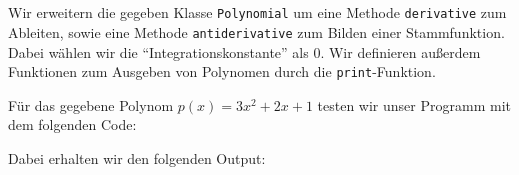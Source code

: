\section{}

Wir erweitern die gegeben Klasse \texttt{Polynomial} um eine Methode \texttt{derivative} zum Ableiten, sowie eine Methode \texttt{antiderivative} zum Bilden einer Stammfunktion.
Dabei wählen wir die \enquote{Integrationskonstante} als $0$.
Wir definieren außerdem Funktionen zum Ausgeben von Polynomen durch die \texttt{print}-Funktion.



Für das gegebene Polynom $p(x) = 3 x^2 + 2 x + 1$ testen wir unser Programm mit dem folgenden Code:



Dabei erhalten wir den folgenden Output:





